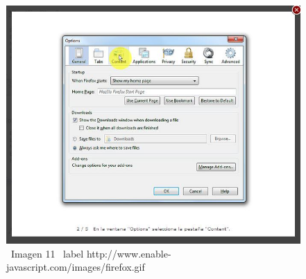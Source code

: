 \documentclass[11pt]{article} %
\begin{document}
\begin{figure}
\begin{center}
\includegraphics[height=8 cm, width=8 cm] {imagenes/firefox 02.JPG}
\newline
\newline
\ Imagen 11
\ label {http://www.enable-javascript.com/images/firefox.gif }

\end{center}
\end{figure}
\end{document}
